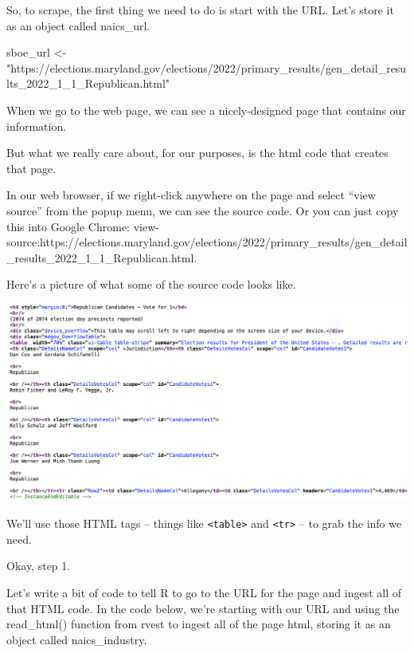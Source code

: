 \documentclass[
  letterpaper,
  DIV=11,
  numbers=noendperiod]{scrreprt}
\newenvironment{Shaded}{\begin{snugshade}}{\end{snugshade}}
\newcommand{\NormalTok}[1]{\textcolor[rgb]{0.00,0.23,0.31}{#1}}
\newcommand{\OtherTok}[1]{\textcolor[rgb]{0.00,0.23,0.31}{#1}}
\newcommand{\StringTok}[1]{\textcolor[rgb]{0.13,0.47,0.30}{#1}}
\begin{document}
So, to scrape, the first thing we need to do is start with the URL.
Let's store it as an object called naics\_url.

\begin{Shaded}
\begin{Highlighting}[]
\NormalTok{sboe\_url }\OtherTok{\textless{}{-}} \StringTok{"https://elections.maryland.gov/elections/2022/primary\_results/gen\_detail\_results\_2022\_1\_1\_Republican.html"}
\end{Highlighting}
\end{Shaded}

When we go to the web page, we can see a nicely-designed page that
contains our information.

But what we really care about, for our purposes, is the html code that
creates that page.

In our web browser, if we right-click anywhere on the page and select
``view source'' from the popup menu, we can see the source code. Or you
can just copy this into Google Chrome:
view-source:https://elections.maryland.gov/elections/2022/primary\_results/gen\_detail\_results\_2022\_1\_1\_Republican.html.

Here's a picture of what some of the source code looks like.

\includegraphics[width=7.22in,height=\textheight]{./images/rvest2.png}

We'll use those HTML tags -- things like
\texttt{\textless{}table\textgreater{}} and
\texttt{\textless{}tr\textgreater{}} -- to grab the info we need.

Okay, step 1.

Let's write a bit of code to tell R to go to the URL for the page and
ingest all of that HTML code. In the code below, we're starting with our
URL and using the read\_html() function from rvest to ingest all of the
page html, storing it as an object called naics\_industry.
\end{document}
